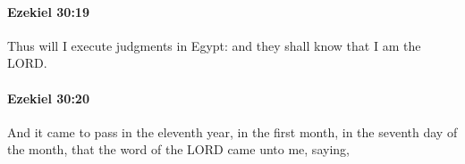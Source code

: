 		\paragraph{Ezekiel 30:19} %
			\label{EZEKIEL-30-19}

			Thus will I execute judgments in Egypt: and they shall know that I am the LORD.


		\paragraph{Ezekiel 30:20} %
			\label{EZEKIEL-30-20}

			And it came to pass in the eleventh year, in the first month, in the seventh day of the month, that the word of the LORD came unto me, saying,


